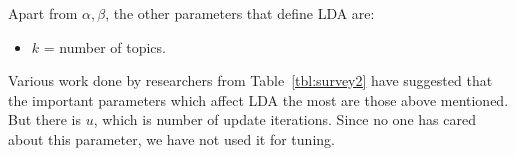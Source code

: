 \documentclass[10pt,conference]{IEEEtran}
\newcommand{\bi}{\begin{itemize}}
\newcommand{\ei}{\end{itemize}}
\newcommand{\be}{\begin{enumerate}}
\newcommand{\ee}{\end{enumerate}}
\theoremstyle{break}
\begin{document}
Apart from $\alpha,\beta$, the other parameters that define LDA
are:
\bi
\item $k$ = number of topics.
\ei
Various work done by researchers from Table~\ref{tbl:survey2} have suggested that the important parameters which affect LDA the most are those above mentioned. But there is $u$, which is number of update iterations. Since no one has cared about this parameter, we have not used it for tuning.


\begin{figure}[!t]
  
  


\scriptsize
\begin{center}
\begin{tabular}{c|c|c|c|c}
 

\end{tabular}
\end{center}
\end{figure}
\end{document}
